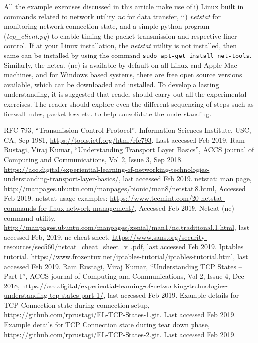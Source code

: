 \begin{multicols}{2}
All the example exercises discussed in this article make use of i) Linux built in commands related to network utility \textit{nc} for data transfer, ii) \textit{netstat} for monitoring network connection state, and a simple python program (\textit{tcp\_client.py}) to enable timing the packet transmission and respective finer control. If at your Linux installation, the \textit{netstat} utility is not installed, then same can be installed by using the command \lstinline|sudo apt-get install net-tools|. Similarly, the netcat (nc) is available by default on all Linux and Apple Mac machines, and for Windows based systems, there are free open source versions available, which can be downloaded and installed. To develop a lasting understanding, it is suggested that reader should carry out all the experimental exercises. The reader should explore even the different sequencing of steps such as firewall rules, packet loss etc. to help consolidate the understanding.

\begin{thebibliography}{99}
 RFC 793, ``Transmission Control Protocol'', Information Sciences Institute, USC, CA, Sep 1981, \url{https://tools.ietf.org/html/rfc793}. Last accessed Feb 2019.
 Ram Rustagi, Viraj Kumar, ``Understanding Transport Layer Basics'', ACCS journal of Computing and Communications, Vol 2, Issue 3, Sep 2018. \url{https://acc.digital/experiential-learning-of-networking-technologies-understanding-transport-layer-basics/}, last accessed Feb 2019.
 netstat: man page, \url{http://manpages.ubuntu.com/manpages/bionic/man8/netstat.8.html}, Accessed Feb 2019.
 netstat usage examples: \url{https://www.tecmint.com/20-netstat-commands-for-linux-network-management/}, Accessed Feb 2019.
 Netcat (nc) command utility, \url{http://manpages.ubuntu.com/manpages/xenial/man1/nc.traditional.1.html}, last accessed Feb, 2019.
 nc cheat-sheet, \url{https://www.sans.org/security-resources/sec560/netcat_cheat_sheet_v1.pdf}, last accessed Feb 2019.
 Iptables tutorial. \url{https://www.frozentux.net/iptables-tutorial/iptables-tutorial.html}, last accessed Feb 2019.
 Ram Rustagi, Viraj Kumar, ``Understanding TCP States -- Part I'', ACCS journal of Computing and Communications, Vol 2, Issue 4, Dec 2018; \url{https://acc.digital/experiential-learning-of-networking-technologies-understanding-tcp-states-part-1/}, last accessed Feb 2019.
 Example details for TCP Connection state during connection setup, \url{https://github.com/rprustagi/EL-TCP-States-1.git}. Last accessed Feb 2019.
 Example details for TCP Connection state during tear down phase, \url{https://github.com/rprustagi/EL-TCP-States-2.git}. Last accessed Feb 2019.
\end{thebibliography}
\end{multicols}
